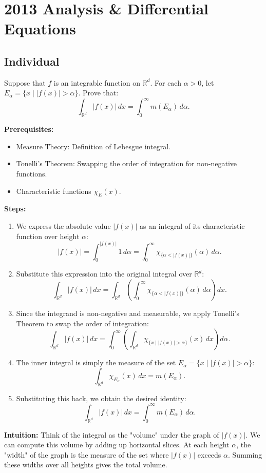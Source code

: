 \section{2013 Analysis \& Differential Equations}

\subsection{Individual}

\begin{exercise}
\label{analysis:2013:1}
Suppose that $f$ is an integrable function on $\mathbb{R}^d$. For each $\alpha>0$, let $E_{\alpha}=\{x\mid |f(x)|>\alpha\}$. Prove that:
\[
\int_{\mathbb{R}^d}|f(x)|\,dx = \int_0^{\infty} m(E_{\alpha})\,d\alpha.
\]
\end{exercise}

\begin{solution}
\textbf{Prerequisites:}
\begin{itemize}
    \item Measure Theory: Definition of Lebesgue integral.
    \item Tonelli's Theorem: Swapping the order of integration for non-negative functions.
    \item Characteristic functions $\chi_E(x)$.
\end{itemize}

\textbf{Steps:}
\begin{enumerate}
    \item We express the absolute value $|f(x)|$ as an integral of its characteristic function over height $\alpha$:
    \[
    |f(x)| = \int_0^{|f(x)|} 1 \, d\alpha = \int_0^\infty \chi_{\{ \alpha < |f(x)| \}}(\alpha) \, d\alpha.
    \]
    \item Substitute this expression into the original integral over $\mathbb{R}^d$:
    \[
    \int_{\mathbb{R}^d} |f(x)| \, dx = \int_{\mathbb{R}^d} \left( \int_0^\infty \chi_{\{ \alpha < |f(x)| \}}(\alpha) \, d\alpha \right) dx.
    \]
    \item Since the integrand is non-negative and measurable, we apply Tonelli's Theorem to swap the order of integration:
    \[
    \int_{\mathbb{R}^d} |f(x)| \, dx = \int_0^\infty \left( \int_{\mathbb{R}^d} \chi_{\{ x \mid |f(x)| > \alpha \}}(x) \, dx \right) d\alpha.
    \]
    \item The inner integral is simply the measure of the set $E_\alpha = \{x \mid |f(x)| > \alpha\}$:
    \[
    \int_{\mathbb{R}^d} \chi_{E_\alpha}(x) \, dx = m(E_\alpha).
    \]
    \item Substituting this back, we obtain the desired identity:
    \[
    \int_{\mathbb{R}^d} |f(x)| \, dx = \int_0^\infty m(E_\alpha) \, d\alpha.
    \]
\end{enumerate}

\textbf{Intuition:}
Think of the integral as the "volume" under the graph of $|f(x)|$. We can compute this volume by adding up horizontal slices. At each height $\alpha$, the "width" of the graph is the measure of the set where $|f(x)|$ exceeds $\alpha$. Summing these widths over all heights gives the total volume.
\end{solution}

